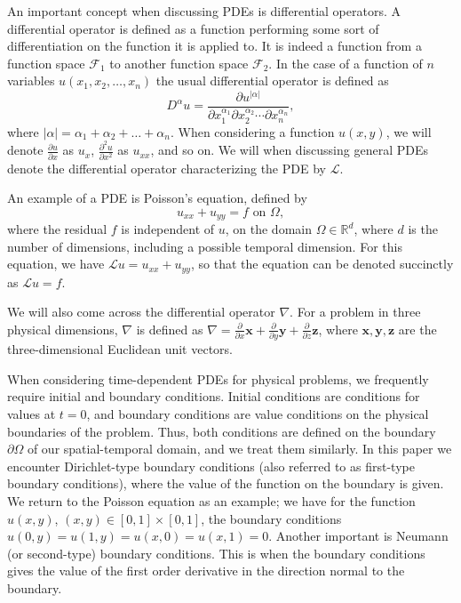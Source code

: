 An important concept when discussing PDEs is differential operators.
A differential operator is defined as a function performing some sort of differentiation on the function it is applied to.
It is indeed a function from a function space $\mathcal{F}_1$ to another function space $\mathcal{F}_2$.
In the case of a function of $n$ variables $u(x_1, x_2, \ldots , x_n)$ the usual differential operator is defined as 
\begin{equation*}
    D^\alpha u = \frac{\partial u^{|\alpha|}}{\partial x_1^{\alpha_1} \partial x_2^{\alpha_2} \cdots \partial x_n^{\alpha_n}},
\end{equation*}
where $|\alpha| = \alpha_1 + \alpha_2 + \ldots + \alpha_n$.
When considering a function $u(x,y)$, we will denote $\frac{\partial u}{\partial x}$ as $u_x$, $\frac{\partial^2 u}{\partial x^2}$ as $u_{xx}$, and so on.
We will when discussing general PDEs denote the differential operator characterizing the PDE by $\mathcal{L}$.

An example of a PDE is Poisson's equation, defined by
\begin{equation*}
    u_{xx} + u_{yy} = f \text{ on }\Omega,
\end{equation*}
where the residual $f$ is independent of $u$, on the domain $\Omega \in \mathbb{R}^d$, where $d$ is the number of dimensions, including a possible temporal dimension.
For this equation, we have $\mathcal{L}u = u_{xx} + u_{yy}$, so that the equation can be denoted succinctly as $\mathcal{L}u = f$.

We will also come across the differential operator $\nabla$.
For a problem in three physical dimensions, $\nabla$ is defined as $\nabla = \frac{\partial}{\partial x}\boldsymbol{x} + \frac{\partial}{\partial y}\boldsymbol{y} + \frac{\partial}{\partial z}\boldsymbol{z}$, where $\boldsymbol{x},\boldsymbol{y},\boldsymbol{z}$ are the three-dimensional Euclidean unit vectors.

When considering time-dependent PDEs for physical problems, we frequently require initial and boundary conditions.
Initial conditions are conditions for values at $t=0$, and boundary conditions are value conditions on the physical boundaries of the problem.
Thus, both conditions are defined on the boundary $\partial\Omega$ of our spatial-temporal domain, and we treat them similarly.
In this paper we encounter Dirichlet-type boundary conditions (also referred to as first-type boundary conditions), where the value of the function on the boundary is given.
We return to the Poisson equation as an example;
we have for the function $u(x,y)$, $(x,y) \in [0,1]\times [0,1]$, the boundary conditions $u(0,y)=u(1,y)=u(x,0)=u(x,1) = 0$.
Another important is Neumann (or second-type) boundary conditions.
This is when the boundary conditions gives the value of the first order derivative in the direction normal to the boundary. 

